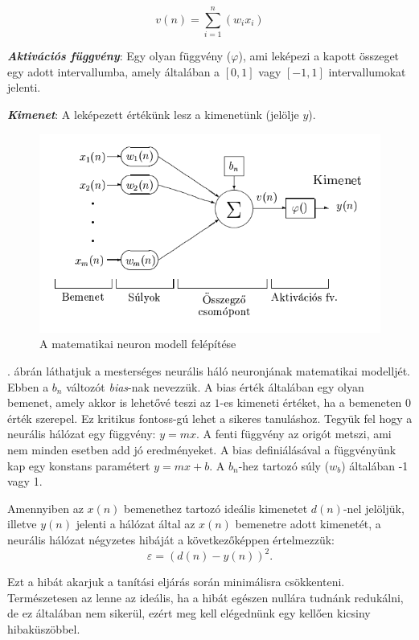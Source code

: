 $$
v(n) = \sum_{i=1}^{n}(w_ix_i)
$$

\textit{\textbf{Aktivációs függvény}}: Egy olyan függvény ($\varphi$), ami leképezi a kapott összeget egy adott intervallumba, amely általában a $[0, 1]$ vagy $[-1, 1]$ intervallumokat jelenti.

\textbf{\textit{Kimenet}}: A leképezett értékünk lesz a kimenetünk (jelölje $y$).

\begin{figure}
	\centering
	\includegraphics[scale=0.6]{images/ANNParts.png}
	\caption{A matematikai neuron modell felépítése}
	\label{fig:ANNParts}
\end{figure}

. ábrán láthatjuk a mesterséges neurális háló neuronjának matematikai modelljét. Ebben a $b_n$ változót \textit{bias}-nak nevezzük. A bias érték általában egy olyan bemenet, amely akkor is lehetővé teszi az $1$-es kimeneti értéket, ha a bemeneten $0$ érték szerepel. Ez kritikus fontoss-gú lehet a sikeres tanuláshoz. Tegyük fel hogy a neurális hálózat egy függvény: $y = mx$. A fenti függvény az origót metszi, ami nem minden esetben add jó eredményeket. A bias definiálásával a függvényünk kap egy konstans paramétert $y = mx + b$. A $b_n$-hez tartozó súly ($w_b$) általában -1 vagy 1.

Amennyiben az $x(n)$ bemenethez tartozó ideális kimenetet $d(n)$-nel jelöljük, illetve $y(n)$ jelenti a hálózat által az $x(n)$ bemenetre adott kimenetét, a neurális hálózat négyzetes hibáját a következőképpen értelmezzük:
$$
\varepsilon = (d(n) - y(n))^2.
$$

Ezt a hibát akarjuk a tanítási eljárás során minimálisra csökkenteni. Természetesen az lenne az ideális, ha a hibát egészen nullára tudnánk redukálni, de ez általában nem sikerül, ezért meg kell elégednünk egy kellően kicsiny hibaküszöbbel.

